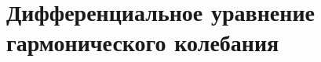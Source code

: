\documentclass[14pt, oneside]{extbook}
\begin{document}
\section{Дифференциальное уравнение гармонического колебания}

%
%
%
%
\end{document}
